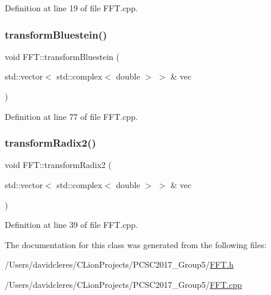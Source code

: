 Definition at line 19 of file F\+F\+T.\+cpp.

\mbox{\label{class_f_f_t_a2f45c15b3053ec0cc8ebc33bcd6da935}} 
\subsubsection{\texorpdfstring{transform\+Bluestein()}{transformBluestein()}}
{\footnotesize\ttfamily void F\+F\+T\+::transform\+Bluestein (\begin{DoxyParamCaption}\item[{std\+::vector$<$ std\+::complex$<$ double $>$ $>$ \&}]{vec }\end{DoxyParamCaption})}



Definition at line 77 of file F\+F\+T.\+cpp.

\mbox{\label{class_f_f_t_ae6d16a7fd911180ae2f4f1a3c08f7819}} 
\subsubsection{\texorpdfstring{transform\+Radix2()}{transformRadix2()}}
{\footnotesize\ttfamily void F\+F\+T\+::transform\+Radix2 (\begin{DoxyParamCaption}\item[{std\+::vector$<$ std\+::complex$<$ double $>$ $>$ \&}]{vec }\end{DoxyParamCaption})}



Definition at line 39 of file F\+F\+T.\+cpp.



The documentation for this class was generated from the following files\+:\begin{DoxyCompactItemize}
\item 
/\+Users/davidcleres/\+C\+Lion\+Projects/\+P\+C\+S\+C2017\+\_\+\+Group5/\mbox{\hyperlink{_f_f_t_8h}{F\+F\+T.\+h}}\item 
/\+Users/davidcleres/\+C\+Lion\+Projects/\+P\+C\+S\+C2017\+\_\+\+Group5/\mbox{\hyperlink{_f_f_t_8cpp}{F\+F\+T.\+cpp}}\end{DoxyCompactItemize}
